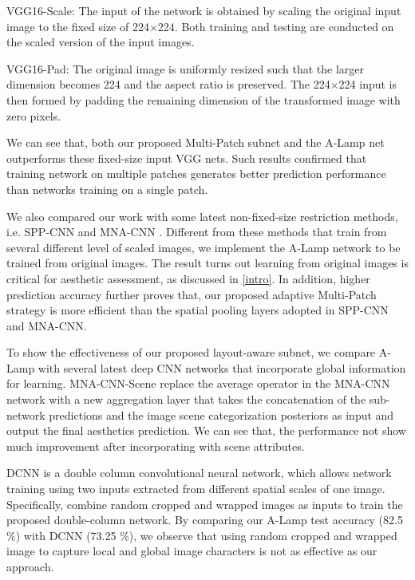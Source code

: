 \documentclass[10pt,twocolumn,letterpaper]{article}
\begin{document}
VGG16-Scale: The input of the network is obtained by scaling
the original input image to the fixed size of 224$\times$224. Both training and testing are conducted on the scaled version of the input images.

VGG16-Pad: The original image is uniformly resized such that the larger dimension becomes 224 and the aspect ratio is preserved. The 224$\times$224 input is then formed by padding the remaining dimension of the transformed image with zero pixels.

We can see that, both our proposed Multi-Patch subnet and the A-Lamp net outperforms these fixed-size input VGG nets. Such results confirmed that training network on multiple patches generates better prediction performance than networks training on a single patch.

We also compared our work with some latest non-fixed-size restriction methods, i.e. SPP-CNN \cite{He:archive:2014} and MNA-CNN \cite{Mai:2016:CVPR}.  Different from these methods that train from several different level of scaled images, we implement the A-Lamp network to be trained from original images. The result turns out learning from original images is critical for aesthetic assessment, as discussed in \ref{intro}. In addition, higher prediction accuracy further proves that, our proposed adaptive Multi-Patch strategy is more efficient than the spatial pooling layers adopted in SPP-CNN and MNA-CNN.

To show the effectiveness of our proposed layout-aware subnet, we compare A-Lamp with several latest deep CNN networks that incorporate global information for learning. MNA-CNN-Scene \cite{Mai:2016:CVPR} replace the average operator in the MNA-CNN network with a new aggregation layer that takes the concatenation of the sub-network predictions and the image scene categorization posteriors as input and output the final aesthetics prediction. We can see that, the performance not show much improvement after incorporating with scene attributes. 

DCNN is a double column convolutional neural network, which allows network
training using two inputs extracted from different spatial scales of one image.
Specifically, \cite{Lu:2014:TMM:rating} combine random cropped and wrapped images as inputs to train the proposed double-column network. By comparing our A-Lamp test accuracy (82.5 $\%$) with DCNN (73.25 $\%$), we observe that using random cropped and wrapped image to capture local and global image characters is not as effective as our approach.  
\end{document}
